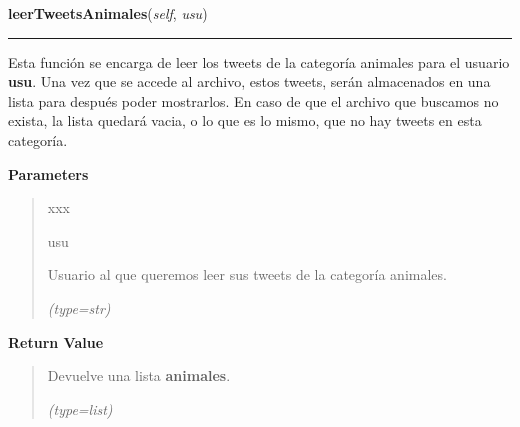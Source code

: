 \hspace{.8\funcindent}\begin{boxedminipage}{\funcwidth}

    \raggedright \textbf{leerTweetsAnimales}(\textit{self}, \textit{usu})

    \vspace{-1.5ex}

    \rule{\textwidth}{0.5\fboxrule}
\setlength{\parskip}{2ex}
    Esta función se encarga de leer los tweets de la categoría animales 
    para el usuario \textbf{usu}. Una vez que se accede al archivo, estos 
    tweets, serán almacenados en una lista para después poder mostrarlos. 
    En caso de que el archivo que buscamos no exista, la lista quedará 
    vacia, o lo que es lo mismo, que no hay tweets en esta categoría.

\setlength{\parskip}{1ex}
      \textbf{Parameters}
      \vspace{-1ex}

      \begin{quote}
        \begin{Ventry}{xxx}

          \item[usu]

          Usuario al que queremos leer sus tweets de la categoría animales.

            {\it (type=str)}

        \end{Ventry}

      \end{quote}

      \textbf{Return Value}
    \vspace{-1ex}

      \begin{quote}
      Devuelve una lista \textbf{animales}.

      {\it (type=list)}

      \end{quote}

    \end{boxedminipage}

    \label{funcionesTwitter:FuncionesTwitter:obtenerTweetsComida}

    \vspace{0.5ex}

